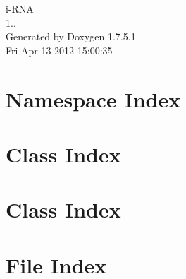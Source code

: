 \documentclass[a4paper]{book}
\begin{document}
\hypersetup{pageanchor=false,citecolor=blue}
\begin{titlepage}
\vspace*{7cm}
\begin{center}
{\Large i-\/\-R\-N\-A \\[1ex]\large 1.. }\\
\vspace*{1cm}
{\large \-Generated by Doxygen 1.7.5.1}\\
\vspace*{0.5cm}
{\small Fri Apr 13 2012 15:00:35}\\
\end{center}
\end{titlepage}
\clearemptydoublepage
{}
\tableofcontents
\clearemptydoublepage
{}
\hypersetup{pageanchor=true,citecolor=blue}
\chapter{\-Namespace \-Index}

\chapter{\-Class \-Index}

\chapter{\-Class \-Index}

\chapter{\-File \-Index}

\end{document}
